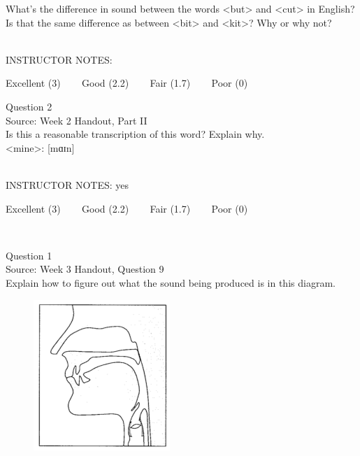 \documentclass[12pt]{article}
\begin{document}
What’s the difference in sound between the words <but> and <cut> in English? Is that the same difference as between <bit> and <kit>? Why or why not?


~\\
INSTRUCTOR NOTES: 


\vfill
Excellent (3) ~~~ Good (2.2) ~~~ Fair (1.7) ~~~ Poor (0)
\newpage

{\large Question 2}\\

Source: Week 2 Handout, Part II\\

Is this a reasonable transcription of this word? Explain why.\\

<mine>: {[mɑɪn]}


~\\
INSTRUCTOR NOTES: yes


\vfill
Excellent (3) ~~~ Good (2.2) ~~~ Fair (1.7) ~~~ Poor (0)
\newpage

\begin{center}
\textbf{{\color{red}{\HUGE END OF EXAM}}}\\

\end{center}
\newpage

\begin{center}
\textbf{{\color{blue}{\HUGE START OF EXAM\\}}}

\textbf{{\color{blue}{\HUGE Student ID: 30263\\}}}

\textbf{{\color{blue}{\HUGE 4:40\\}}}

\end{center}
\newpage

{\large Question 1}\\

Source: Week 3 Handout, Question 9\\

Explain how to figure out what the sound being produced is in this diagram.\\

\begin{figure}[H]
\includegraphics{../images/sagittal_p.png}
\end{figure}
\end{document}
